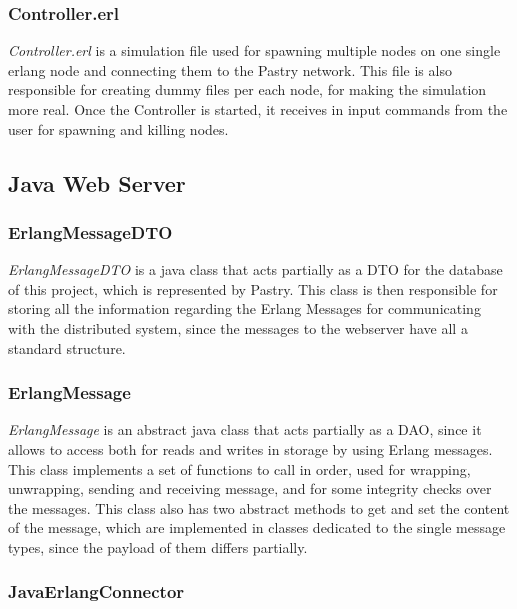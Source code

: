 \documentclass{article}
\begin{document}
\subsubsection{Controller.erl}

\textit{Controller.erl} is a simulation file used for spawning multiple nodes on one single erlang node and connecting them to the Pastry network.
This file is also responsible for creating dummy files per each node, for making the simulation more real.
Once the Controller is started, it receives in input commands from the user for spawning and killing nodes.

\subsection{Java Web Server}

\subsubsection{ErlangMessageDTO}

\textit{ErlangMessageDTO} is a java class that acts partially as a DTO for the database of this project, which is represented by Pastry.
This class is then responsible for storing all the information regarding the Erlang Messages for communicating with the distributed system, 
since the messages to the webserver have all a standard structure.

\subsubsection{ErlangMessage}

\textit{ErlangMessage} is an abstract java class that acts partially as a DAO, since it allows to access both for reads and writes in storage by using 
Erlang messages. This class implements a set of functions to call in order, used for wrapping, unwrapping, sending and receiving message, and 
for some integrity checks over the messages. This class also has two abstract methods to get and set the content of the message, which are implemented in 
classes dedicated to the single message types, since the payload of them differs partially.

\subsubsection{JavaErlangConnector}
\end{document}
